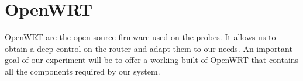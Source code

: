 \section{OpenWRT}
OpenWRT are the open-source firmware used on the probes. It allows us to obtain a deep control on the router and adapt them to our needs. An important goal of our experiment will be to offer a working built of OpenWRT that contains all the components required by our system.